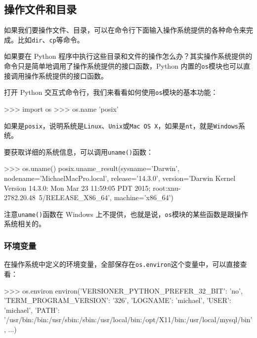 \hypertarget{ux64cdux4f5cux6587ux4ef6ux548cux76eeux5f55}{%
\subsection{操作文件和目录}\label{ux64cdux4f5cux6587ux4ef6ux548cux76eeux5f55}}

如果我们要操作文件、目录，可以在命令行下面输入操作系统提供的各种命令来完成。比如\texttt{dir}、\texttt{cp}等命令。

如果要在 Python
程序中执行这些目录和文件的操作怎么办？其实操作系统提供的命令只是简单地调用了操作系统提供的接口函数，Python
内置的\texttt{os}模块也可以直接调用操作系统提供的接口函数。

打开 Python 交互式命令行，我们来看看如何使用\texttt{os}模块的基本功能：

\begin{pythoncode}
>>> import os
>>> os.name 
'posix'
\end{pythoncode}

如果是\texttt{posix}，说明系统是\texttt{Linux}、\texttt{Unix}或\texttt{Mac\ OS\ X}，如果是\texttt{nt}，就是\texttt{Windows}系统。

要获取详细的系统信息，可以调用\texttt{uname()}函数：

\begin{pythoncode}
>>> os.uname()
posix.uname_result(sysname='Darwin', nodename='MichaelMacPro.local', release='14.3.0', version='Darwin Kernel Version 14.3.0: Mon Mar 23 11:59:05 PDT 2015; root:xnu-2782.20.48~5/RELEASE_X86_64', machine='x86_64')
\end{pythoncode}

注意\texttt{uname()}函数在 Windows
上不提供，也就是说，\texttt{os}模块的某些函数是跟操作系统相关的。

\hypertarget{ux73afux5883ux53d8ux91cf}{%
\subsubsection{环境变量}\label{ux73afux5883ux53d8ux91cf}}

在操作系统中定义的环境变量，全部保存在\texttt{os.environ}这个变量中，可以直接查看：

\begin{pythoncode}
>>> os.environ
environ({'VERSIONER_PYTHON_PREFER_32_BIT': 'no', 'TERM_PROGRAM_VERSION': '326', 'LOGNAME': 'michael', 'USER': 'michael', 'PATH': '/usr/bin:/bin:/usr/sbin:/sbin:/usr/local/bin:/opt/X11/bin:/usr/local/mysql/bin', ...})
\end{pythoncode}

